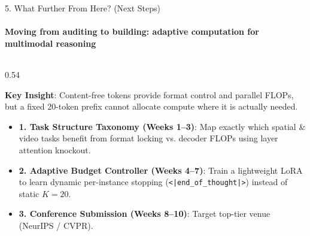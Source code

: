 \documentclass[aspectratio=169, 10pt]{beamer}
\begin{document}
\begin{frame}{5. What Further From Here? (Next Steps)}
  \framesubtitle{Moving from auditing to building: adaptive computation for multimodal reasoning}
  
  \begin{columns}[T]
    \begin{column}{0.54\textwidth}
      \begin{tcolorbox}[accentcard, title=\textbf{Proposed Direction: Adaptive Latent Allocation}]
        \scriptsize
        \textbf{Key Insight}: Content-free tokens provide format control and parallel FLOPs, but a fixed 20-token prefix cannot allocate compute where it is actually needed.
        \vspace{3pt}
        \begin{itemize}\setlength{\itemsep}{2pt}
          \item \textbf{1. Task Structure Taxonomy (Weeks 1--3)}: Map exactly which spatial \& video tasks benefit from format locking vs. decoder FLOPs using layer attention knockout.
          \item \textbf{2. Adaptive Budget Controller (Weeks 4--7)}: Train a lightweight LoRA to learn dynamic per-instance stopping (\texttt{<|end\_of\_thought|>}) instead of static $K=20$.
          \item \textbf{3. Conference Submission (Weeks 8--10)}: Target top-tier venue (NeurIPS / CVPR).
        \end{itemize}
      \end{tcolorbox}
    \end{column}
    

\end{columns}
\end{frame}
\end{document}
